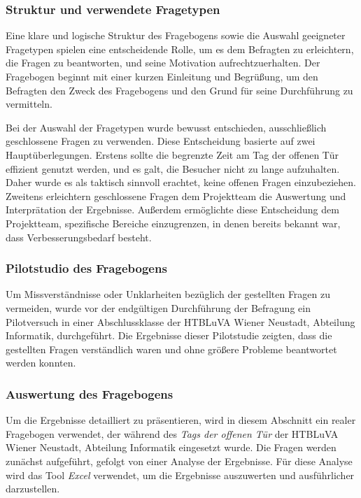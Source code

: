 \subsubsection{Struktur und verwendete Fragetypen}
Eine klare und logische Struktur des Fragebogens sowie die Auswahl geeigneter Fragetypen spielen eine entscheidende Rolle,
um es dem Befragten zu erleichtern, die Fragen zu beantworten, und seine Motivation aufrechtzuerhalten. Der Fragebogen
beginnt mit einer kurzen Einleitung und Begrüßung, um den Befragten den Zweck des Fragebogens und den Grund für seine
Durchführung zu vermitteln.

Bei der Auswahl der Fragetypen wurde bewusst entschieden, ausschließlich geschlossene Fragen zu verwenden. Diese Entscheidung
basierte auf zwei Hauptüberlegungen. Erstens sollte die begrenzte Zeit am Tag der offenen Tür effizient genutzt werden,
und es galt, die Besucher nicht zu lange aufzuhalten. Daher wurde es als taktisch sinnvoll erachtet, keine offenen Fragen
einzubeziehen. Zweitens erleichtern geschlossene Fragen dem Projektteam die Auswertung und Interprätation der Ergebnisse.
Außerdem ermöglichte diese Entscheidung dem Projektteam, spezifische Bereiche einzugrenzen, in denen bereits bekannt war,
dass Verbesserungsbedarf besteht.

\subsubsection{Pilotstudio des Fragebogens}
Um Missverständnisse oder Unklarheiten bezüglich der gestellten Fragen zu vermeiden, wurde vor der endgültigen Durchführung
der Befragung ein Pilotversuch in einer Abschlussklasse der HTBLuVA Wiener Neustadt, Abteilung Informatik, durchgeführt.
Die Ergebnisse dieser Pilotstudie zeigten, dass die gestellten Fragen verständlich waren und ohne größere Probleme beantwortet
werden konnten.

\subsubsection{Auswertung des Fragebogens}
Um die Ergebnisse detailliert zu präsentieren, wird in diesem Abschnitt ein realer Fragebogen verwendet, der während des
\textit{Tags der offenen Tür} der HTBLuVA Wiener Neustadt, Abteilung Informatik eingesetzt wurde. Die Fragen werden zunächst
aufgeführt, gefolgt von einer Analyse der Ergebnisse. Für diese Analyse wird das Tool \textit{Excel} verwendet, um die
Ergebnisse auszuwerten und ausführlicher darzustellen.

